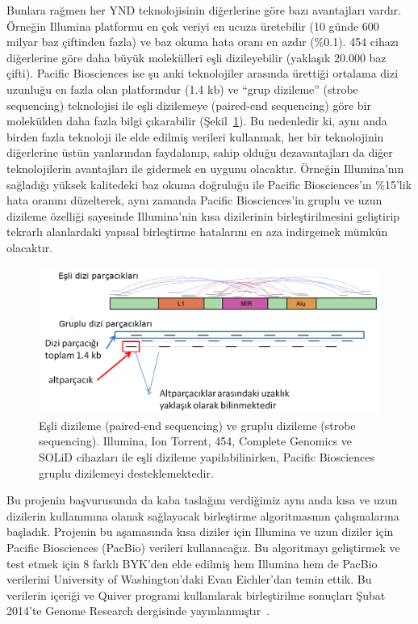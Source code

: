 \documentclass[11pt]{article}
\begin{document}
Bunlara rağmen her YND teknolojisinin diğerlerine göre bazı avantajları vardır. Örneğin Illumina platformu en çok veriyi en ucuza üretebilir (10 günde 600 milyar baz çiftinden fazla) ve baz okuma hata oranı en azdır (\%0.1). 454 cihazı diğerlerine göre daha büyük molekülleri eşli dizileyebilir (yaklaşık 20.000 baz çifti). Pacific Biosciences ise şu anki teknolojiler arasında ürettiği ortalama dizi uzunluğu en fazla olan platformdur (1.4 kb) ve ``grup dizileme'' (strobe sequencing) teknolojisi ile eşli dizilemeye (paired-end sequencing) göre bir molekülden daha fazla bilgi çıkarabilir (Şekil~\ref{fig:strobe}). Bu nedenledir ki, aynı anda birden fazla teknoloji ile elde edilmiş verileri kullanmak, her bir teknolojinin diğerlerine üstün yanlarından faydalanıp, sahip olduğu dezavantajları da diğer teknolojilerin avantajları ile gidermek en uygunu olacaktır. Örneğin Illumina'nın sağladığı yüksek kalitedeki baz okuma doğruluğu ile Pacific Biosciences'ın \%15'lik hata oranını düzelterek, aynı zamanda Pacific Biosciences'in gruplu ve uzun dizileme özelliği sayesinde Illumina'nin kısa dizilerinin birleştirilmesini geliştirip tekrarlı alanlardaki yapısal birleştirme hatalarını en aza indirgemek mümkün olacaktır.

\begin{figure}[htb]
\begin{center}
  \includegraphics[scale=0.75]{strobe.png}
\end{center}
\caption{Eşli dizileme (paired-end sequencing) ve gruplu dizileme (strobe sequencing). Illumina, Ion Torrent, 454, Complete Genomics ve SOLiD cihazları ile eşli dizileme yapilabilinirken, Pacific Biosciences gruplu dizilemeyi desteklemektedir.}
\label{fig:strobe}
\end{figure}


Bu projenin başvurusunda da kaba taslağını verdiğimiz aynı anda kısa ve uzun dizilerin kullanımına olanak sağlayacak birleştirme algoritmasının çalışmalarına başladık. Projenin bu aşamasında
 kısa diziler için Illumina ve uzun diziler için Pacific Biosciences (PacBio) verileri kullanacağız. Bu algoritmayı geliştirmek ve test etmek için 8 farklı BYK'den elde edilmiş 
hem Illumina hem de PacBio verilerini University of Washington'daki Evan Eichler'dan temin ettik. Bu verilerin içeriği ve Quiver 
programi kullanılarak birleştirilme sonuçları Şubat 2014’te Genome Research dergisinde yayınlanmıştır~\cite{Huddleston2014}. 
\end{document}
